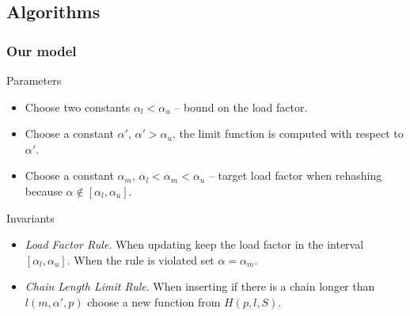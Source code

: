 \subsection{Algorithms}
\begin{frame}
	\frametitle{Our model}

	\begin{block}{Parameters}
		\begin{itemize}
			\item Choose two constants $\alpha_l < \alpha_u$ -- bound on the load factor.
			\item Choose a constant $\alpha'$, $\alpha' > \alpha_u$, the limit function is computed with respect to $\alpha'$.
			\item Choose a constant $\alpha_m$, $\alpha_l < \alpha_m < \alpha_u$ -- target load factor when rehashing because $\alpha \notin [\alpha_l, \alpha_u]$. 
		\end{itemize}
	\end{block}
	
	\begin{block}{Invariants}
		\begin{itemize}
			\item \emph{Load Factor Rule}. When updating keep the load factor in the interval $[\alpha_l, \alpha_u]$. When the rule is violated set $\alpha = \alpha_m$.
			\item \emph{Chain Length Limit Rule}. When inserting if there is a chain longer than $l(m, \alpha', p)$ choose a new function from $H(p, l, S)$.
		\end{itemize}
	\end{block}
\end{frame}

